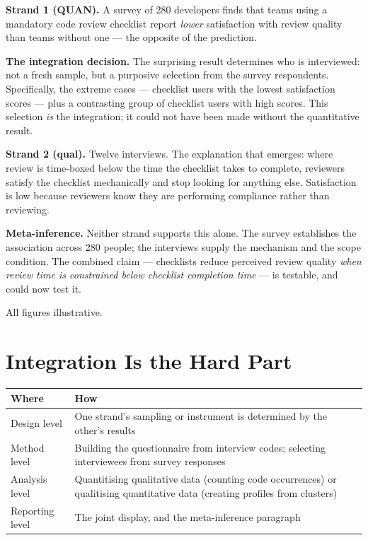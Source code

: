 \begin{worked}
\textbf{Strand 1 (QUAN).} A survey of 280 developers finds that teams using a
mandatory code review checklist report \emph{lower} satisfaction with review
quality than teams without one --- the opposite of the prediction.

\medskip
\textbf{The integration decision.} The surprising result determines who is
interviewed: not a fresh sample, but a purposive selection from the survey
respondents. Specifically, the extreme cases --- checklist users with the
lowest satisfaction scores --- plus a contrasting group of checklist users with
high scores. This selection \emph{is} the integration; it could not have been
made without the quantitative result.

\medskip
\textbf{Strand 2 (qual).} Twelve interviews. The explanation that emerges:
where review is time-boxed below the time the checklist takes to complete,
reviewers satisfy the checklist mechanically and stop looking for anything
else. Satisfaction is low because reviewers know they are performing
compliance rather than reviewing.

\medskip
\textbf{Meta-inference.} Neither strand supports this alone. The survey
establishes the association across 280 people; the interviews supply the
mechanism and the scope condition. The combined claim --- checklists reduce
perceived review quality \emph{when review time is constrained below checklist
completion time} --- is testable, and  could now test it.

\medskip
All figures illustrative.
\end{worked}

\section{Integration Is the Hard Part}

\begin{center}
\small
\begin{tabular}{@{}L{3.2cm}L{11.1cm}@{}}
\toprule
\textbf{Where} & \textbf{How} \\
\midrule
Design level   & One strand's sampling or instrument is determined by the
                 other's results \\
Method level   & Building the questionnaire from interview codes; selecting
                 interviewees from survey responses \\
Analysis level & Quantitising qualitative data (counting code occurrences) or
                 qualitising quantitative data (creating profiles from
                 clusters) \\
Reporting level& The joint display, and the meta-inference paragraph \\
\bottomrule
\end{tabular}
\end{center}

